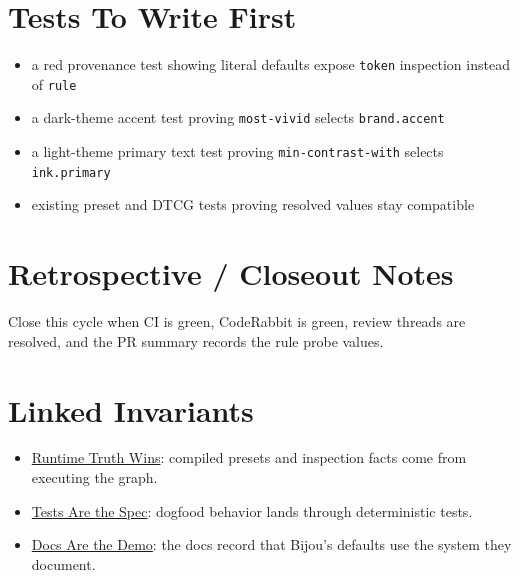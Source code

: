 \section{Tests To Write First}\label{record-185-tests-to-write-first}

\begin{itemize}
\tightlist
\item
  a red provenance test showing literal defaults expose \texttt{t\allowbreak{}o\allowbreak{}k\allowbreak{}e\allowbreak{}n} inspection instead of \texttt{r\allowbreak{}u\allowbreak{}l\allowbreak{}e}
\item
  a dark-theme accent test proving \texttt{m\allowbreak{}o\allowbreak{}s\allowbreak{}t\allowbreak{}-\allowbreak{}v\allowbreak{}i\allowbreak{}v\allowbreak{}i\allowbreak{}d} selects \texttt{b\allowbreak{}r\allowbreak{}a\allowbreak{}n\allowbreak{}d\allowbreak{}.\allowbreak{}a\allowbreak{}c\allowbreak{}c\allowbreak{}e\allowbreak{}n\allowbreak{}t}
\item
  a light-theme primary text test proving \texttt{m\allowbreak{}i\allowbreak{}n\allowbreak{}-\allowbreak{}c\allowbreak{}o\allowbreak{}n\allowbreak{}t\allowbreak{}r\allowbreak{}a\allowbreak{}s\allowbreak{}t\allowbreak{}-\allowbreak{}w\allowbreak{}i\allowbreak{}t\allowbreak{}h} selects \texttt{i\allowbreak{}n\allowbreak{}k\allowbreak{}.\allowbreak{}p\allowbreak{}r\allowbreak{}i\allowbreak{}m\allowbreak{}a\allowbreak{}r\allowbreak{}y}
\item
  existing preset and DTCG tests proving resolved values stay compatible
\end{itemize}

\section{Retrospective / Closeout Notes}\label{record-185-retrospective-closeout-notes}

Close this cycle when CI is green, CodeRabbit is green, review threads are resolved, and the PR summary records the rule probe values.

\section{Linked Invariants}\label{record-185-linked-invariants}

\begin{itemize}
\tightlist
\item
  \href{https://github.com/flyingrobots/bijou/blob/cbd70612140e7a450d764b3c7be1c6af878b99bc/docs/invariants/runtime-truth-wins.md}{Runtime Truth Wins}: compiled presets and inspection facts come from executing the graph.
\item
  \href{https://github.com/flyingrobots/bijou/blob/cbd70612140e7a450d764b3c7be1c6af878b99bc/docs/invariants/tests-are-the-spec.md}{Tests Are the Spec}: dogfood behavior lands through deterministic tests.
\item
  \href{https://github.com/flyingrobots/bijou/blob/cbd70612140e7a450d764b3c7be1c6af878b99bc/docs/invariants/docs-are-the-demo.md}{Docs Are the Demo}: the docs record that Bijou's defaults use the system they document.
\end{itemize}

